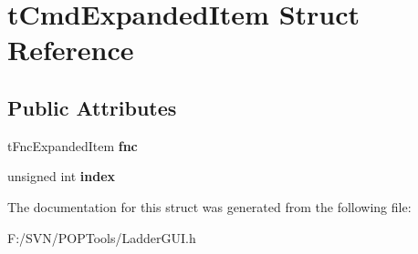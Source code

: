 \hypertarget{structt_cmd_expanded_item}{\section{t\-Cmd\-Expanded\-Item Struct Reference}
\label{structt_cmd_expanded_item}
}
\subsection*{Public Attributes}
\begin{DoxyCompactItemize}
\item 
\hypertarget{structt_cmd_expanded_item_a7ac5a59e0fb754044367f1c3cb3571e5}{t\-Fnc\-Expanded\-Item {\bfseries fnc}}\label{structt_cmd_expanded_item_a7ac5a59e0fb754044367f1c3cb3571e5}

\item 
\hypertarget{structt_cmd_expanded_item_a5a75196b7b3b685754f0f188587b67b7}{unsigned int {\bfseries index}}\label{structt_cmd_expanded_item_a5a75196b7b3b685754f0f188587b67b7}

\end{DoxyCompactItemize}


The documentation for this struct was generated from the following file\-:\begin{DoxyCompactItemize}
\item 
F\-:/\-S\-V\-N/\-P\-O\-P\-Tools/Ladder\-G\-U\-I.\-h\end{DoxyCompactItemize}
